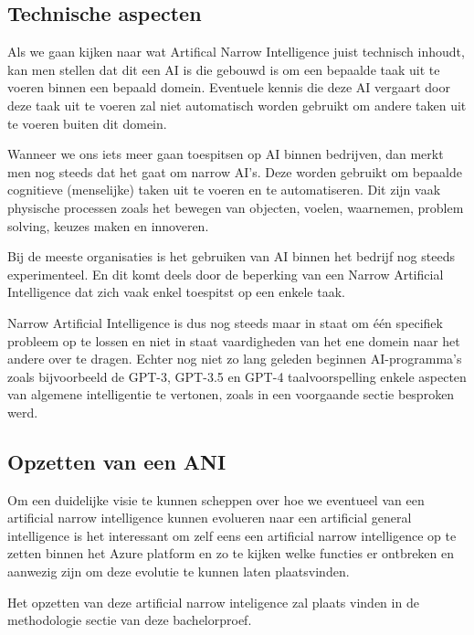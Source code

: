 \subsection{Technische aspecten}

Als we gaan kijken naar wat Artifical Narrow Intelligence juist technisch inhoudt, kan men stellen dat dit een AI is die gebouwd is om een bepaalde taak uit te voeren binnen een bepaald domein. Eventuele kennis die deze AI vergaart door deze taak uit te voeren zal niet automatisch worden gebruikt om andere taken uit te voeren buiten dit domein. 

Wanneer we ons iets meer gaan toespitsen op AI binnen bedrijven, dan merkt men nog steeds dat het gaat om narrow AI’s. Deze worden gebruikt om bepaalde cognitieve (menselijke) taken uit te voeren en te automatiseren. Dit zijn vaak physische processen zoals het bewegen van objecten, voelen, waarnemen, problem solving, keuzes maken en innoveren. 

Bij de meeste organisaties is het gebruiken van AI binnen het bedrijf nog steeds experimenteel. En dit komt deels door de beperking van een Narrow Artificial Intelligence dat zich vaak enkel toespitst op een enkele taak.

Narrow Artificial Intelligence is dus nog steeds maar in staat om één specifiek probleem op te lossen en niet in staat vaardigheden van het ene domein naar het andere over te dragen. Echter nog niet zo lang geleden beginnen AI-programma’s zoals bijvoorbeeld de GPT-3, GPT-3.5 en GPT-4 taalvoorspelling enkele aspecten van algemene intelligentie te vertonen, zoals in een voorgaande sectie besproken werd.

\autocite{benbya2020artificial}

\subsection{Opzetten van een ANI}

Om een duidelijke visie te kunnen scheppen over hoe we eventueel van een artificial narrow intelligence kunnen evolueren naar een artificial general intelligence is het interessant om zelf eens een artificial narrow intelligence op te zetten binnen het Azure platform en zo te kijken welke functies er ontbreken en aanwezig zijn om deze evolutie te kunnen laten plaatsvinden.

Het opzetten van deze artificial narrow inteligence zal plaats vinden in de methodologie sectie van deze bachelorproef.


